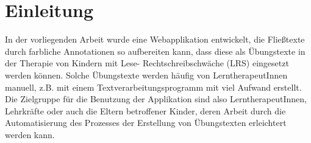 
\chapter{Einleitung}

In der vorliegenden Arbeit wurde eine Webapplikation entwickelt, die Fließtexte durch farbliche Annotationen so aufbereiten kann, dass diese als Übungstexte in der Therapie von Kindern mit Lese- Rechtschreibschwäche (LRS) eingesetzt werden können. Solche Übungstexte werden häufig von LerntherapeutInnen manuell, z.B. mit einem Textverarbeitungsprogramm mit viel Aufwand erstellt. Die Zielgruppe für die Benutzung der Applikation sind also LerntherapeutInnen, Lehrkräfte oder auch die Eltern betroffener Kinder, deren Arbeit durch die Automatisierung des Prozesses der Erstellung von Übungstexten erleichtert werden kann.\\

